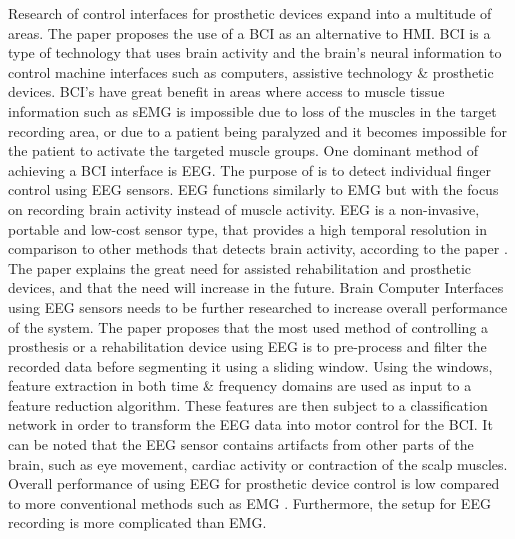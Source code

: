 \documentclass[../main.tex]{subfiles}
\begin{document}
Research of control interfaces for prosthetic devices expand into a multitude of areas.
The paper \cite{fnins2016} proposes the use of a \gls{BCI} as an alternative to \gls{HMI}.
BCI is a type of technology that uses brain activity and the brain's neural information to control machine interfaces such as computers, assistive technology \& prosthetic devices.
BCI's have great benefit in areas where access to muscle tissue information such as sEMG is impossible due to loss of the muscles in the target recording area, or due to a patient being paralyzed and it becomes impossible for the patient to activate the targeted muscle groups.
One dominant method of achieving a BCI interface is \gls{EEG}.
The purpose of \cite{fnins2016} is to detect individual finger control using EEG sensors. 
EEG functions similarly to EMG but with the focus on recording brain activity instead of muscle activity.
EEG is a non-invasive, portable and low-cost sensor type, that provides a high temporal resolution in comparison to other methods that detects brain activity, according to the paper \cite{quraishi2018}.
The paper explains the great need for assisted rehabilitation and prosthetic devices, and that the need will increase in the future.
Brain Computer Interfaces using EEG sensors needs to be further researched to increase overall performance of the system.
The paper proposes that the most used method of controlling a prosthesis or a rehabilitation device using EEG is to pre-process and filter the recorded data before segmenting it using a sliding window.
Using the windows, feature extraction in both time \& frequency domains are used as input to a feature reduction algorithm.
These features are then subject to a classification network in order to transform the EEG data into motor control for the BCI.
It can be noted that the EEG sensor contains artifacts from other parts of the brain, such as eye movement, cardiac activity or contraction of the scalp muscles. 
Overall performance of using EEG for prosthetic device control is low compared to more conventional methods such as EMG \cite{quraishi2018}.
Furthermore, the setup for EEG recording is more complicated than EMG.
\end{document}
